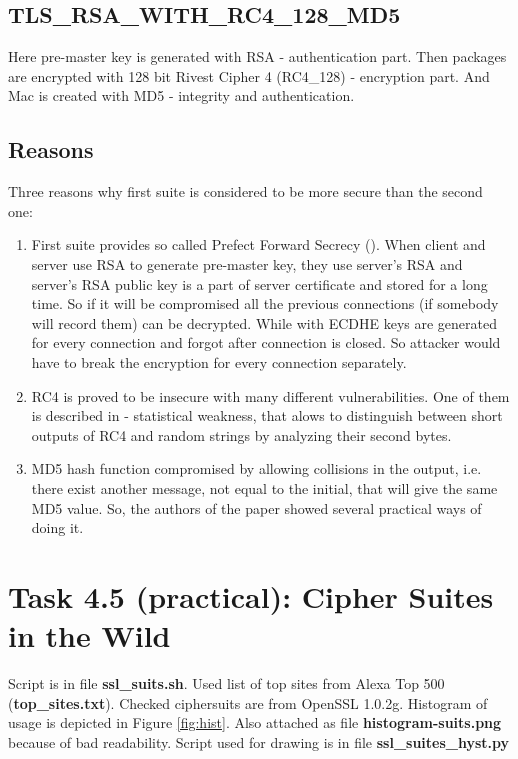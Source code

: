 \documentclass{article}
\begin{document}
\subsection*{TLS\_RSA\_WITH\_RC4\_128\_MD5}
Here pre-master key is generated with RSA - authentication part. Then packages are encrypted with 128 bit Rivest Cipher 4 (RC4\_128) - encryption part. And Mac is created with MD5 - integrity and authentication.

\subsection*{Reasons}
Three reasons why first suite is considered to be more secure than the second one:
\begin{enumerate}
\item First suite provides so called Prefect Forward Secrecy (\cite{pfc}). When client and server use RSA to generate pre-master key, they use server's RSA and server's RSA public key is a part of server certificate and stored for a long time. So if it will be compromised all the previous connections (if somebody will record them) can be decrypted. While with ECDHE keys are generated for every connection and forgot after connection is closed. So attacker would have to break the encryption for every connection separately.
\item RC4 is proved to be insecure with many different vulnerabilities. One of them is described in \cite{rc4-vuln} - statistical weakness, that alows to distinguish between short outputs of RC4 and random strings by analyzing their second bytes. 
\item MD5 hash function compromised by allowing collisions in the output, i.e. there exist another message, not equal to the initial, that will give the same MD5 value. So, the authors of the paper \cite{md5-coll} showed several practical ways of doing it.
\end{enumerate}

\section*{Task 4.5 (practical): Cipher Suites in the Wild}
Script is in file \textbf{ssl\_suits.sh}. Used list of top sites from Alexa Top 500 (\textbf{top\_sites.txt}). Checked ciphersuits are from OpenSSL 1.0.2g. Histogram of usage is depicted in Figure \ref{fig:hist}. Also attached as file \textbf{histogram-suits.png} because of bad readability. Script used for drawing is in file \textbf{ssl\_suites\_hyst.py}
\end{document}
